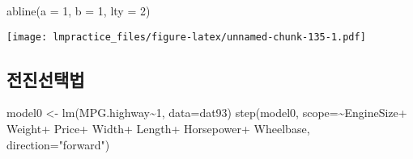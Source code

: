 \documentclass[
]{book}
\newenvironment{Shaded}{\begin{snugshade}}{\end{snugshade}}
\newcommand{\AttributeTok}[1]{\textcolor[rgb]{0.77,0.63,0.00}{#1}}
\newcommand{\DecValTok}[1]{\textcolor[rgb]{0.00,0.00,0.81}{#1}}
\newcommand{\FunctionTok}[1]{\textcolor[rgb]{0.00,0.00,0.00}{#1}}
\newcommand{\NormalTok}[1]{#1}
\newcommand{\OtherTok}[1]{\textcolor[rgb]{0.56,0.35,0.01}{#1}}
\newcommand{\SpecialCharTok}[1]{\textcolor[rgb]{0.00,0.00,0.00}{#1}}
\newcommand{\StringTok}[1]{\textcolor[rgb]{0.31,0.60,0.02}{#1}}
\begin{document}
\begin{Shaded}
\begin{Highlighting}[]
\FunctionTok{abline}\NormalTok{(}\AttributeTok{a =} \DecValTok{1}\NormalTok{, }\AttributeTok{b =} \DecValTok{1}\NormalTok{, }\AttributeTok{lty =} \DecValTok{2}\NormalTok{)}
\end{Highlighting}
\end{Shaded}

\texttt{[image: lmpractice\_files/figure-latex/unnamed-chunk-135-1.pdf]}

\hypertarget{uxc804uxc9c4uxc120uxd0dduxbc95-1}{%
\subsection{전진선택법}\label{uxc804uxc9c4uxc120uxd0dduxbc95-1}}

\begin{Shaded}
\begin{Highlighting}[]
\NormalTok{model0 }\OtherTok{\textless{}{-}} \FunctionTok{lm}\NormalTok{(MPG.highway}\SpecialCharTok{\textasciitilde{}}\DecValTok{1}\NormalTok{, }\AttributeTok{data=}\NormalTok{dat93)}
\FunctionTok{step}\NormalTok{(model0,  }\AttributeTok{scope=}\SpecialCharTok{\textasciitilde{}}\NormalTok{EngineSize}\SpecialCharTok{+}\NormalTok{ Weight}\SpecialCharTok{+}\NormalTok{ Price}\SpecialCharTok{+}\NormalTok{ Width}\SpecialCharTok{+}\NormalTok{ Length}\SpecialCharTok{+}\NormalTok{ Horsepower}\SpecialCharTok{+}\NormalTok{ Wheelbase, }\AttributeTok{direction=}\StringTok{"forward"}\NormalTok{)}
\end{Highlighting}
\end{Shaded}
\end{document}
